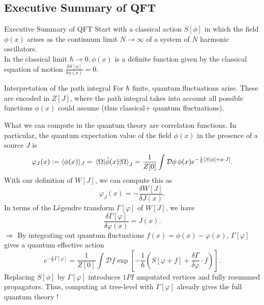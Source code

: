 \subsection{Executive Summary of QFT }
\begin{mybox}{Executive Summary of QFT}
Start with a classical action $S[\phi]$ in which the field $\phi(x)$ arises as the continuum limit $N\rightarrow \infty$ of a system of $N$ harmonic oscillators.\\
In the classical limit $\hbar \rightarrow 0, \phi(x)$ is a definite function given by the classical equation of motion $\frac{\delta S[\phi]}{\delta \phi(x)}=0$.
\begin{mybox}{Interpretation of the path integral}
	For $\hbar$ finite, quantum fluctuations arise. These are encoded in $Z[J]$, where the path integral takes into account all possible functions $\phi(x)$ could assume (thus classical+ quantum fluctuations).
\end{mybox}
What we can compute in the quantum theory are correlation functions. In particular, the quantum expectation value of the field $\phi(x)$ in the presence of a source $J$ is
\begin{equation}
	\varphi_J(x) := \langle \phi(x) \rangle_J = \expval{\hat{ \phi}(x) }{\Omega}_J = \frac{1}{Z[0]} \int \mathcal{D}\phi \, \phi(x) e^{- \frac{1}{\hbar} [S[\phi] + \phi \cdot J]}.
\end{equation}
With our definition of $W[J]$, we can compute this as 
\begin{equation}
	\varphi_J(x) = - \frac{\delta W[J]}{\delta J(x)}.
\end{equation}
In terms of the Légendre transform $\Gamma[\varphi]$ of $W[J]$, we have
\begin{equation}
	\frac{\delta \Gamma[\varphi]}{\delta \varphi(x)} = J(x).
\end{equation}
$\Rightarrow$ By integrating out quantum fluctuations $f(x)=\phi(x)-\varphi(x)$, $\Gamma[\varphi]$ gives a quantum effective action
\begin{equation}
	e^{- \frac{1}{\hbar} \Gamma[\varphi]} = \frac{1}{Z[0]} \int \mathcal{D}f \exp\left[-\frac{1}{\hbar} \left(S[\varphi+f] + \frac{\delta \Gamma}{\delta \varphi} \cdot f\right)\right].
\end{equation}
Replacing $S[\phi]$ by $\Gamma[\varphi]$ introduces $1PI$ amputated vertices and fully resummed propagators. Thus, computing at tree-level with $\Gamma[\varphi]$ already gives the full quantum theory !
\end{mybox}



